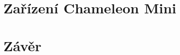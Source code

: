 

\chapter{Zařízení Chameleon Mini}
\label{zarizeni_chameleon_mini}







\chapter{Závěr}
\label{zaver}


